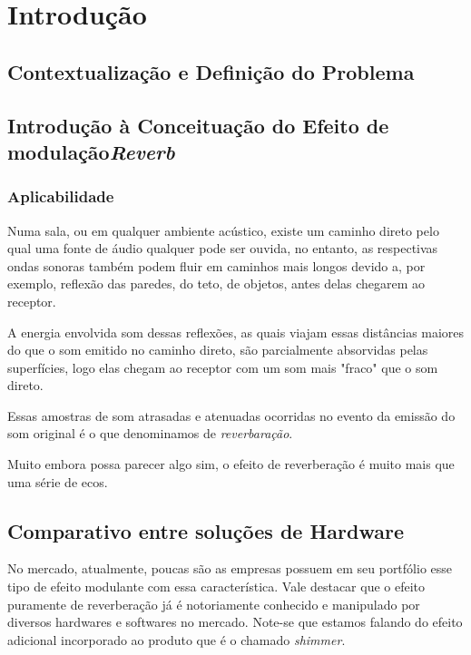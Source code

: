 \chapter{Introdução}



\section{Contextualização e Definição do Problema}

\section{Introdução à Conceituação do Efeito  de modulação\textit{Reverb}}
	\subsection{Aplicabilidade}
		Numa sala, ou em qualquer ambiente acústico, existe um caminho direto pelo qual uma fonte de áudio qualquer pode ser ouvida, no entanto, as respectivas ondas sonoras também podem fluir em caminhos mais longos devido a, por exemplo, reflexão das paredes, do teto, de objetos, antes delas chegarem ao receptor.
		
		A energia envolvida som dessas reflexões, as quais viajam essas distâncias maiores do que o som emitido no caminho direto, são parcialmente absorvidas pelas superfícies, logo elas chegam ao receptor com um som mais "fraco" que o som direto.
		
		Essas amostras de som atrasadas e atenuadas ocorridas no evento da emissão do som original é o que denominamos de \textit{reverbaração}.
		
		Muito embora possa parecer algo sim, o efeito de reverberação é muito mais que uma série de ecos. 

\section{Comparativo entre soluções de Hardware}

		No mercado, atualmente, poucas são as empresas possuem em seu portfólio esse tipo de efeito modulante com essa característica. Vale destacar que o efeito puramente de reverberação já é notoriamente conhecido e manipulado por diversos hardwares e softwares no mercado. Note-se que estamos falando do efeito adicional incorporado ao produto que é o chamado \textit{shimmer}.
		
